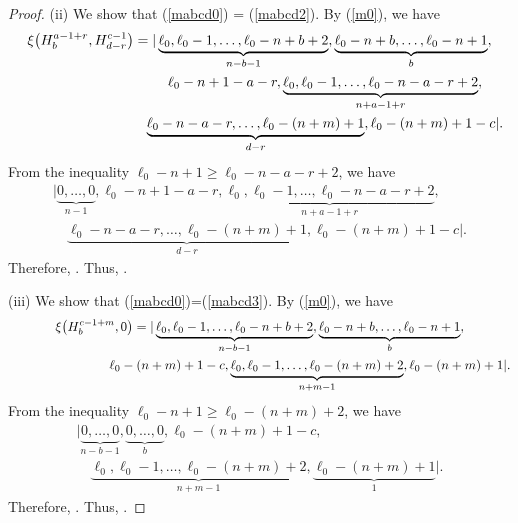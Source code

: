 \documentclass[10pt,a4paper]{amsart}
\numberwithin{equation}{section}
\begin{document}
\begin{proof}
(ii) We show that (\ref{mabcd0}) = (\ref{mabcd2}). By (\ref{m0}), we have
\begin{gather*}
\xi\bigl(H^{a-1+r}_{b},H^{c-1}_{d-r}\bigr)=|\underbrace{\ell_{0},\ell_{0}-1,\dots,\ell_{0}-n+b+2}_{n-b-1},\underbrace{\ell_{0}-n+b,\dots,\ell_{0}-n+1}_{b},\\
\hphantom{\xi\bigl(H^{a-1+r}_{b},H^{c-1}_{d-r}\bigr)=|}{}
\,\ell_{0}-n+1-a-r,\underbrace{\ell_{0},\ell_{0}-1,\dots,\ell_{0}-n-a-r+2}_{n+a-1+r},\\
\hphantom{\xi\bigl(H^{a-1+r}_{b},H^{c-1}_{d-r}\bigr)=|}{}
\underbrace{\ell_{0}-n-a-r,\dots,\ell_{0}-(n+m)+1}_{d-r},\ell_{0}-(n+m)+1-c|.
\end{gather*}
From the inequality $\ell_0-n+1\geq\ell_0-n-a-r+2$, we have
\begin{gather*}
|\underbrace{0,\dots,0}_{n-1},\ell_{0}-n+1-a-r,\underbrace{\ell_{0},\ell_{0}-1,\dots,\ell_{0}-n-a-r+2}_{n+a-1+r},\nonumber\\
\quad{}\underbrace{\ell_{0}-n-a-r,\dots,\ell_{0}-(n+m)+1}_{d-r},\ell_{0}-(n+m)+1-c|\nonumber.
\end{gather*}
Therefore, . Thus, .


(iii) We show that (\ref{mabcd0})=(\ref{mabcd3}). By (\ref{m0}), we have
\begin{gather*}
\xi\bigl(H^{c-1+m}_{b},0\bigr)=|\underbrace{\ell_{0},\ell_{0}-1,\dots,\ell_{0}-n+b+2}_{n-b-1},%
\underbrace{\ell_{0}-n+b,\dots,\ell_{0}-n+1}_{b},\nonumber\\
\hphantom{\xi\bigl(H^{c-1+m}_{b},0\bigr)=|}{}
\,\ell_{0}-(n+m)+1-c,\underbrace{\ell_{0},\ell_{0}-1,\dots,\ell_{0}-(n+m)+2}_{n+m-1},%
\ell_{0}-(n+m)+1|\nonumber.
\end{gather*}
From the inequality $\ell_{0}-n+1\geq \ell_0-(n+m)+2$, we have
\begin{gather*}
|\underbrace{0,\dots,0}_{n-b-1},
\underbrace{0,\dots,0}_{b},\ell_{0}-(n+m)+1-c,\nonumber\\
\quad{}\underbrace{\ell_{0},\ell_{0}-1,\dots,\ell_{0}-(n+m)+2}_{n+m-1},%
\underbrace{\ell_{0}-(n+m)+1}_{1}|\nonumber.
\end{gather*}
Therefore, . Thus, .


\end{proof}
\end{document}
